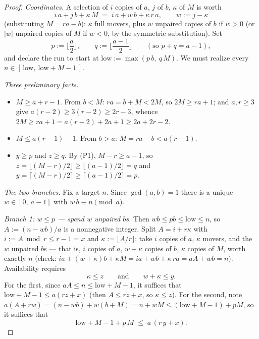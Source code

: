 \documentclass[11pt,reqno]{amsart}
\theoremstyle{plain}
\theoremstyle{definition}
\theoremstyle{remark}
\begin{document}
\begin{proof}
\emph{Coordinates.} A selection of $i$ copies of $a$, $j$ of $b$, $\kappa$ of $M$
is worth
\[
  i\,a + j\,b + \kappa\,M \;=\; i\,a + w\,b + \kappa\,r\,a, \qquad w := j - \kappa
\]
(substituting $M = ra - b$): $\kappa$ full movers, plus $w$ unpaired copies of $b$
if $w > 0$ (or $|w|$ unpaired copies of $M$ if $w < 0$, by the symmetric
substitution). Set
\[
  p := \Big\lfloor \frac a2 \Big\rfloor, \qquad q := \Big\lfloor \frac{a-1}{2}
  \Big\rfloor \qquad (\text{so } p + q = a - 1),
\]
and declare the run to start at $\mathrm{low} := \max(p\,b,\ q\,M)$. We must
realize every $n \in [\,\mathrm{low},\ \mathrm{low} + M - 1\,]$.

\emph{Three preliminary facts.}
\begin{itemize}
\item[(P1)] $M \ge a + r - 1$. From $b < M$: $ra = b + M < 2M$, so $2M \ge ra +
      1$; and $a, r \ge 3$ give $a(r-2) \ge 3(r-2) \ge 2r - 3$, whence $2M \ge ra
      + 1 = a(r-2) + 2a + 1 \ge 2a + 2r - 2$.
\item[(P2)] $M \le a(r-1) - 1$. From $b > a$: $M = ra - b < a(r-1)$.
\item[(P3)] $y \ge p$ and $z \ge q$. By (P1), $M - r \ge a - 1$, so $z = \lfloor
      (M-r)/2 \rfloor \ge \lfloor (a-1)/2 \rfloor = q$ and $y = \lceil (M-r)/2
      \rceil \ge \lceil (a-1)/2 \rceil = p$.
\end{itemize}

\emph{The two branches.} Fix a target $n$. Since $\gcd(a, b) = 1$ there is a
unique $w \in [0,\ a-1]$ with $w\,b \equiv n \pmod a$.

\emph{Branch 1: $w \le p$ --- spend $w$ unpaired $b$s.} Then $wb \le pb \le
\mathrm{low} \le n$, so $A := (n - wb)/a$ is a nonnegative integer. Split $A = i +
r\kappa$ with $i := A \bmod r \le r - 1 = x$ and $\kappa := \lfloor A/r \rfloor$:
take $i$ copies of $a$, $\kappa$ movers, and the $w$ unpaired $b$s --- that is,
$i$ copies of $a$, $w + \kappa$ copies of $b$, $\kappa$ copies of $M$, worth
exactly $n$ (check: $ia + (w + \kappa)b + \kappa M = ia + wb + \kappa\,ra = aA +
wb = n$). Availability requires
\[
  \kappa \le z \qquad\text{and}\qquad w + \kappa \le y .
\]
For the first, since $aA \le n \le \mathrm{low} + M - 1$, it suffices that
$\mathrm{low} + M - 1 \le a(rz + x)$ (then $A \le rz + x$, so $\kappa \le z$). For
the second, note $a(A + rw) = (n - wb) + w(b + M) = n + wM \le (\mathrm{low} + M -
1) + pM$, so it suffices that
\[
  \mathrm{low} + M - 1 + p\,M \;\le\; a\,(r\,y + x) . \tag{C$_y$}
\]


\end{proof}
\end{document}
